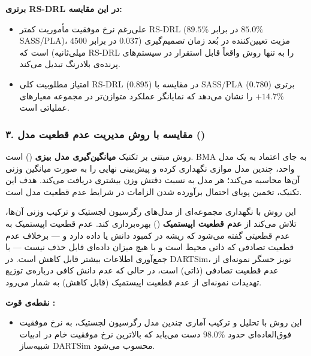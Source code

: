 \documentclass[oneside,openany,a4paper,12pt]{article}
\begin{document}
\textbf{برتری RS-DRL در این مقایسه:}
\begin{itemize}
    \item علی‌رغم نرخ موفقیت مأموریت کمتر RS-DRL ($89.5\%$ در برابر $85.0\%$ SASS/PLA)، مزیت تعیین‌کننده در بُعد زمان تصمیم‌گیری ($0.037$ در برابر $4500$ میلی‌ثانیه) است که RS-DRL را به تنها روش واقعاً قابل استقرار در سیستم‌های پرنده‌ی بلادرنگ تبدیل می‌کند.
    \item امتیاز مطلوبیت کلی RS-DRL ($0.895$) در مقایسه با SASS/PLA ($0.780$) برتری $+14.7\%$ را نشان می‌دهد که نمایانگر عملکرد متوازن‌تر در مجموعه معیارهای عملیاتی است.
\end{itemize}

\subsubsection{۳. مقایسه با روش مدیریت عدم قطعیت مدل  ()}

روش  مبتنی بر تکنیک \textbf{میانگین‌گیری مدل بیزی} () است. BMA به جای اعتماد به یک مدل واحد، چندین مدل موازی نگهداری کرده و پیش‌بینی نهایی را به صورت میانگین وزنی آن‌ها محاسبه می‌کند؛ هر مدل به نسبت دقتش وزن بیشتری دریافت می‌کند. هدف این تکنیک، تخمین پویای احتمال برآورده شدن الزامات در شرایط عدم قطعیت مدل است.

این روش با نگهداری مجموعه‌ای از مدل‌های رگرسیون لجستیک و ترکیب وزنی آن‌ها، تلاش می‌کند از \textbf{عدم قطعیت اپیستمیک} () بهره‌برداری کند. عدم قطعیت اپیستمیک به عدم قطعیتی گفته می‌شود که ریشه در کمبود دانش یا داده دارد و — برخلاف عدم قطعیت تصادفی  که ذاتی محیط است و با هیچ میزان داده‌ای قابل حذف نیست — با جمع‌آوری اطلاعات بیشتر قابل کاهش است. در DARTSim، نویز حسگر نمونه‌ای از عدم قطعیت تصادفی (ذاتی) است، در حالی که عدم دانش کافی درباره‌ی توزیع تهدیدات نمونه‌ای از عدم قطعیت اپیستمیک (قابل کاهش) به شمار می‌رود.

\textbf{نقطه‌ی قوت :}
\begin{itemize}
    \item این روش با تحلیل و ترکیب آماری چندین مدل رگرسیون لجستیک، به نرخ موفقیت فوق‌العاده‌ای حدود $98.0\%$ دست می‌یابد که بالاترین نرخ موفقیت خام در ادبیات شبیه‌ساز DARTSim محسوب می‌شود.
\end{itemize}
\end{document}
